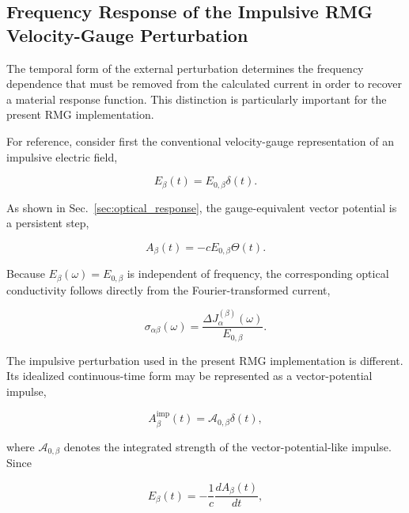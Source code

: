 \subsection{Frequency Response of the Impulsive RMG Velocity-Gauge Perturbation}
\label{sec:rmg_vg_frequency_response}

The temporal form of the external perturbation determines the frequency
dependence that must be removed from the calculated current in order to
recover a material response function.  This distinction is particularly
important for the present RMG implementation.

For reference, consider first the conventional velocity-gauge
representation of an impulsive electric field,

\begin{equation}
E_{\beta}(t)=E_{0,\beta}\delta(t).
\label{eq:standard_e_delta}
\end{equation}

As shown in Sec.~\ref{sec:optical_response}, the gauge-equivalent vector
potential is a persistent step,

\begin{equation}
A_{\beta}(t)
=
-cE_{0,\beta}\Theta(t).
\label{eq:standard_A_step}
\end{equation}

Because $E_{\beta}(\omega)=E_{0,\beta}$ is independent of frequency,
the corresponding optical conductivity follows directly from the
Fourier-transformed current,

\begin{equation}
\sigma_{\alpha\beta}(\omega)
=
\frac{\Delta J_{\alpha}^{(\beta)}(\omega)}
     {E_{0,\beta}}.
\label{eq:standard_vg_conductivity}
\end{equation}

The impulsive perturbation used in the present RMG implementation is
different.  Its idealized continuous-time form may be represented as a
vector-potential impulse,

\begin{equation}
A_{\beta}^{\mathrm{imp}}(t)
=
\mathcal{A}_{0,\beta}\delta(t),
\label{eq:A_delta_impulse}
\end{equation}

where $\mathcal{A}_{0,\beta}$ denotes the integrated strength of the
vector-potential-like impulse.  Since

\begin{equation}
E_{\beta}(t)
=
-\frac{1}{c}
\frac{dA_{\beta}(t)}{dt},
\label{eq:E_from_A_again}
\end{equation}

